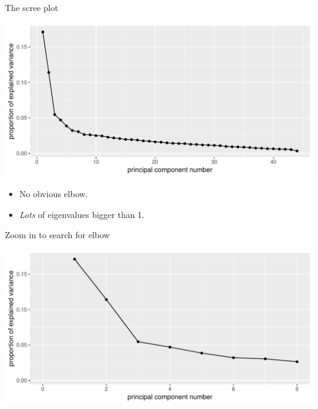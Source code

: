 \begin{frame}[fragile]{The scree plot}
 
\begin{knitrout}
\color{fgcolor}
\includegraphics[width=\maxwidth]{figure/genoa-1} 

\end{knitrout}

  \begin{itemize}
  \item No obvious elbow.
  \item \emph{Lots} of eigenvalues bigger than 1.
  \end{itemize}

  
\end{frame}

\begin{frame}[fragile]{Zoom in to search for elbow}
  
\begin{knitrout}
\color{fgcolor}\begin{kframe}
\begin{alltt}
\hlopt{$}\hlopt{^}\hlstd{,}\hlstd{=}\hlstd{,}\hlstd{=}\hlstd{(}\hlstd{,}\hlstd{))}
\hlstd{(}\hlstd{=}\hlstd{,}\hlstd{=}\hlstd{)}
\end{alltt}
\end{kframe}
\includegraphics[width=\maxwidth]{figure/bem-scree-two-1} 

\end{knitrout}
  
\end{frame}

